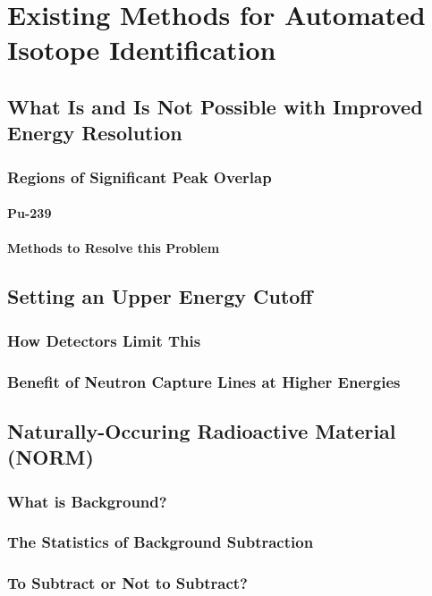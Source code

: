 \chapter{Existing Methods for Automated Isotope Identification}

\section{What Is and Is Not Possible with Improved Energy Resolution}
\subsection{Regions of Significant Peak Overlap}
\subsubsection{Pu-239}
\subsubsection{Methods to Resolve this Problem}

\section{Setting an Upper Energy Cutoff}
\subsection{How Detectors Limit This}
\subsection{Benefit of Neutron Capture Lines at Higher Energies}

\section{Naturally-Occuring Radioactive Material (NORM)}
\subsection{What is Background?}
\subsection{The Statistics of Background Subtraction}
\subsection{To Subtract or Not to Subtract?}
